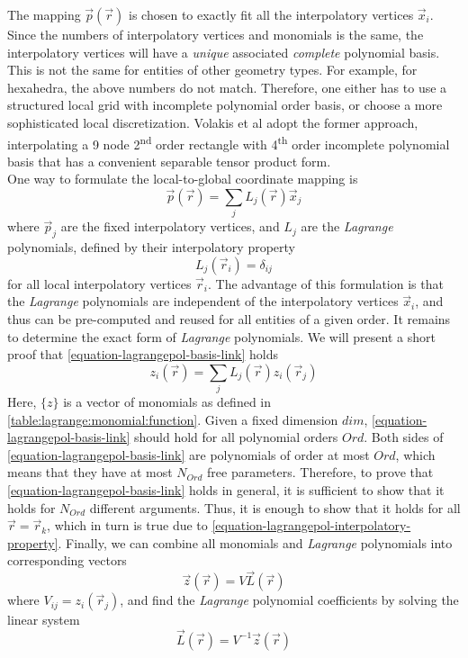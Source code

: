 \noindent
The mapping $\vec{p}(\vec{r})$ is chosen to exactly fit all the interpolatory vertices $\vec{x}_i$. Since the numbers of interpolatory vertices and monomials is the same, the interpolatory vertices will have a \textit{unique} associated \textit{complete} polynomial basis. This is not the same for entities of other geometry types. For example, for hexahedra, the above numbers do not match. Therefore, one either has to use a structured local grid with incomplete polynomial order basis, or choose a more sophisticated local discretization. Volakis et al \cite{volakis+2006} adopt the former approach, interpolating a 9 node 2\textsuperscript{nd} order rectangle with 4\textsuperscript{th} order incomplete polynomial basis that has a convenient separable tensor product form. \\

\noindent
One way to formulate the local-to-global coordinate mapping is
\begin{equation}
	\vec{p}(\vec{r}) = \sum_j L_j(\vec{r})\vec{x}_j 
\end{equation}
\noindent
where $\vec{p}_j $ are the fixed interpolatory vertices, and $L_j$ are the \textit{Lagrange} polynomials, defined by their interpolatory property
\begin{equation}
	\label{equation-lagrangepol-interpolatory-property}
	L_j(\vec{r}_i) = \delta_{ij}
\end{equation}
\noindent
for all local interpolatory vertices $\vec{r}_i$. The advantage of this formulation is that the \textit{Lagrange} polynomials are independent of the interpolatory vertices $\vec{x}_i$, and thus can be pre-computed and reused for all entities of a given order. It remains to determine the exact form of \textit{Lagrange} polynomials. We will present a short proof that \cref{equation-lagrangepol-basis-link} holds
\begin{equation}
	\label{equation-lagrangepol-basis-link}
	z_i(\vec{r}) = \sum_j L_j(\vec{r}) z_i (\vec{r}_j) 
\end{equation}
\noindent
Here, $\{z\}$ is a vector of monomials as defined in \cref{table:lagrange:monomial:function}. Given a fixed dimension $dim$, \cref{equation-lagrangepol-basis-link} should hold for all polynomial orders $Ord$. Both sides of \cref{equation-lagrangepol-basis-link} are polynomials of order at most $Ord$, which means that they have at most $N_{Ord}$ free parameters. Therefore, to prove that \cref{equation-lagrangepol-basis-link} holds in general, it is sufficient to show that it holds for $N_{Ord}$ different arguments. Thus, it is enough to show that it holds for all $\vec{r} = \vec{r}_k$, which in turn is true due to \cref{equation-lagrangepol-interpolatory-property}. Finally, we can combine all monomials and \textit{Lagrange} polynomials into corresponding vectors
\begin{equation}
	\vec{z} (\vec{r}) = V \vec{L} (\vec{r})
\end{equation}
\noindent
where $V_{ij} = z_i (\vec{r}_j)$, and find the \textit{Lagrange} polynomial coefficients by solving the linear system
\begin{equation}
	\label{equation-lagrange-linear-system}
	\vec{L} (\vec{r}) = V^{-1} \vec{z} (\vec{r})
\end{equation}

